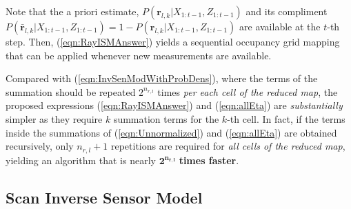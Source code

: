 \documentclass[letterpaper, 10pt, conference]{ieeeconf}
\newcommand{\refeqn}[1]{(\ref{eqn:#1})}
\begin{document}
Note that the a priori estimate, $P(\mathbf{r}_{l,k}|X_{1:t-1},Z_{1:t-1})$ and its compliment $P(\bar{\mathbf{r}}_{l,k}|X_{1:t-1},Z_{1:t-1})=1-P(\mathbf{r}_{l,k}|X_{1:t-1},Z_{1:t-1})$ are available at the $t$-th step. Then, \refeqn{RayISMAnswer} yields a sequential occupancy grid mapping that can be applied whenever new measurements are available. 

Compared with \refeqn{InvSenModWithProbDens}, where the terms of the summation should be repeated $2^{n_{r,l}}$ times \emph{per each cell of the reduced map}, the proposed expressions \refeqn{RayISMAnswer} and \refeqn{allEta} are \textit{substantially} simpler as they require $k$ summation terms for the $k$-th cell. In fact, if the terms inside the summations of \refeqn{Unnormalized} and \refeqn{allEta} are obtained recursively, only $n_{r,l}+1$ repetitions are required for \emph{all cells of the reduced map}, yielding an algorithm that is nearly $\mathbf{2^{n_{r,l}}}$ \textbf{times faster}.


\subsection{Scan Inverse Sensor Model}



\end{document}
